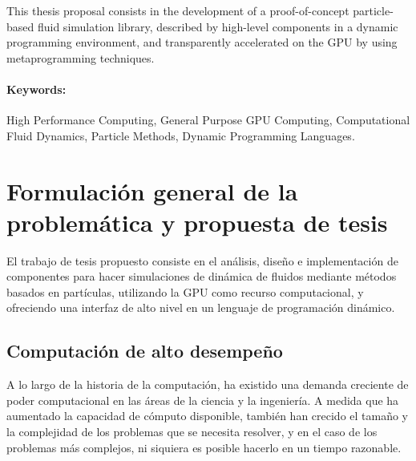 \documentclass[11pt,spanish]{article}
\begin{document}
This thesis proposal consists in the development of a proof-of-concept
particle-based fluid simulation library, described by high-level components in a
dynamic programming environment, and transparently accelerated on the GPU by
using metaprogramming techniques.

\paragraph{Keywords:}
High Performance Computing,
General Purpose GPU Computing,
Computational Fluid Dynamics,
Particle Methods,
Dynamic Programming Languages.

\newpage
\section{Formulación general de la problemática y propuesta de tesis}

%    

El trabajo de tesis propuesto consiste en el análisis, diseño e implementación
de componentes para hacer simulaciones de dinámica de fluidos mediante métodos
basados en partículas, utilizando la GPU como recurso computacional, y
ofreciendo una interfaz de alto nivel en un lenguaje de programación dinámico.

\subsection{Computación de alto desempeño}

A lo largo de la historia de la computación, ha existido una demanda creciente de poder
computacional en las áreas de la ciencia y la ingeniería.  A medida que ha
aumentado la capacidad de cómputo disponible, también han crecido el tamaño y la
complejidad de los problemas que se necesita resolver, y en el caso de los
problemas más complejos, ni siquiera es posible hacerlo en un tiempo razonable.
\cite{parallel-programming}
\end{document}
